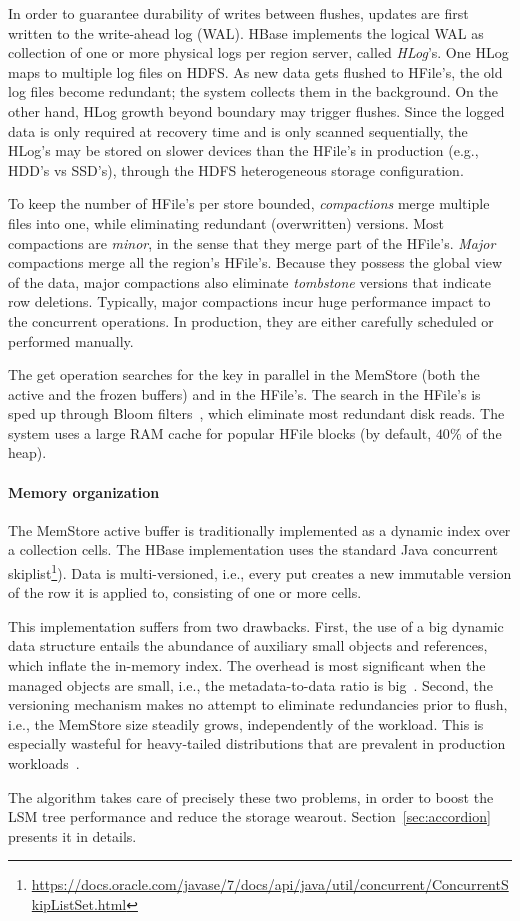 In order to guarantee durability of writes between flushes, updates are first written to 
the write-ahead log (WAL). HBase implements the logical WAL as collection of one or more physical 
logs per region server, called \emph{HLog}'s. One HLog maps to multiple log files on HDFS. 
As new data gets flushed to HFile's, the old log files become redundant; the system collects 
them in the background. On the other hand, HLog growth beyond boundary may trigger flushes. 
Since the logged data is only required at recovery time and is only scanned sequentially, the HLog's 
may be stored on slower devices than the HFile's in production (e.g., HDD's vs SSD's),
through the HDFS heterogeneous storage configuration. 

To keep the number of HFile's per store bounded, \emph{compactions} merge multiple files 
into one, while eliminating redundant (overwritten) versions. Most compactions are \emph{minor}, 
in the sense that they merge part of the HFile's. \emph{Major} compactions merge all the region's 
HFile's. Because they possess the global view of the data, major compactions also eliminate 
{\em tombstone} versions that indicate row deletions. Typically, major compactions incur huge 
performance impact to the concurrent operations. In production, they are either carefully scheduled 
or performed manually. 

The get operation searches for the key in parallel in the MemStore (both the active and the 
frozen buffers) and in the HFile's. The search in the HFile's is sped up through Bloom 
filters~\cite{Chang2008}, which eliminate most redundant disk reads. The system 
uses a large RAM cache for popular HFile blocks (by default, $40\%$ of the heap).

\paragraph{Memory organization}
The MemStore active buffer is traditionally implemented as a dynamic index over a collection cells.  
The HBase implementation uses the standard Java concurrent skiplist\footnote{\small{\url{https://docs.oracle.com/javase/7/docs/api/java/util/concurrent/ConcurrentSkipListSet.html}}}).
Data is multi-versioned, i.e., every put creates a new immutable version of the row it is applied to, 
consisting of one or more cells. 

This implementation suffers from two drawbacks. First, the use of a big dynamic data structure entails 
the abundance of auxiliary small objects and references, which inflate the in-memory index. 
The overhead is most significant when the managed objects
are small, i.e., the metadata-to-data ratio is big~\cite{Wu2015}. Second, the versioning mechanism 
makes no attempt to eliminate redundancies prior to flush, i.e., the MemStore size  steadily grows, 
independently of the workload. This is especially wasteful for heavy-tailed distributions that are 
prevalent in production workloads~\cite{Devineni:2015}. 

The \sys\/ algorithm takes care of precisely these two problems, in order to boost the 
LSM tree performance and reduce the storage wearout. Section~\ref{sec:accordion} 
presents it in details. 







